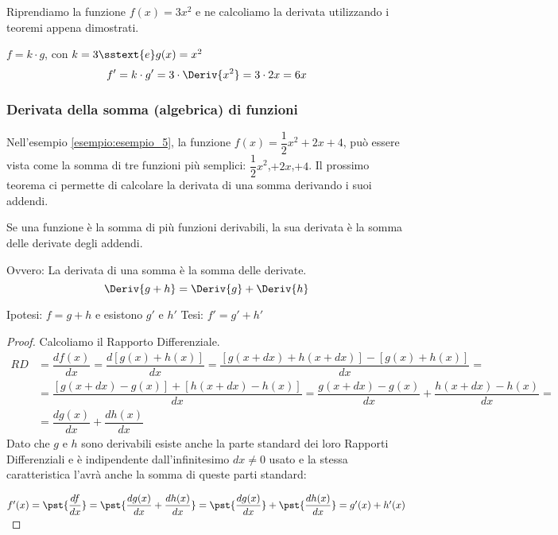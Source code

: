 \begin{esempio}
\label{esem:diff_prodottocostante}
Riprendiamo la funzione \(f(x)=3x^2\) e ne calcoliamo la derivata utilizzando 
i teoremi appena dimostrati.

\(f = k \cdot g\), \quad con \(k = 3 \sstext{e} g(x) = x^2\)
\[f' = k \cdot g' = 3 \cdot \Deriv{x^2} = 3 \cdot 2x = 6x\]
\end{esempio}

\subsubsection{Derivata della somma (algebrica) di funzioni}

Nell'esempio \ref{esempio:esempio_5}, la funzione 
\(f(x)=\dfrac{1}{2}x^2+2x+4\), 
può essere vista come la somma di tre funzioni più semplici:\quad 
\(\dfrac{1}{2}x^2\),\quad \(+2x\),\quad \(+4\).
Il prossimo teorema ci permette di calcolare la derivata di una somma derivando 
i suoi addendi.

\label{subsec:differenziazione_derivatasomma}
\begin{teorema}
Se una funzione è la somma di più funzioni derivabili, la sua 
derivata è la somma delle derivate degli addendi.

Ovvero: La derivata di una somma è la somma delle derivate.
\[\Deriv{g + h}=\Deriv{g}+\Deriv{h}\]
\end{teorema}
\noindent Ipotesi: \(f = g + h\) e esistono \(g'\) e \(h'\) 
\tab Tesi: \(f' = g' + h'\)

\begin{proof}
Calcoliamo il Rapporto Differenziale.
\begin{align*}
 RD&=\dfrac{df(x)}{dx}=\dfrac{d[g(x)+ h(x)]}{dx}=\dfrac{[g(x+dx)+
     h(x+dx)]-[g(x) + h(x)]}{dx}=\\
 &= \dfrac{[g(x+dx)-g(x)] + [h(x+dx)-h(x)]}{dx}= 
 \dfrac{g(x+dx)-g(x)}{dx}+\dfrac{h(x+dx)-h(x)}{dx}=\\
  &=\dfrac{dg(x)}{dx}+\dfrac{dh(x)}{dx}
\end{align*}
Dato che \(g\) e \(h\) sono derivabili esiste anche la parte standard dei 
loro Rapporti Differenziali e è indipendente dall'infinitesimo 
\(dx \neq 0\) usato e la stessa caratteristica l'avrà anche la somma di
queste parti standard:

\(f'(x)=\pst{\dfrac{df}{dx}}=\pst{\dfrac{dg(x)}{dx}+\dfrac{dh(x)}{dx}}=
        \pst{\dfrac{dg(x)}{dx}}+\pst{\dfrac{dh(x)}{dx}}=g'(x)+h'(x)\)
\end{proof}

